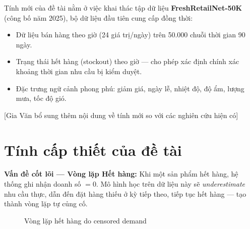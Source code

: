 \documentclass[12pt,a4paper]{report}
\begin{document}
Tính mới của đề tài nằm ở việc khai thác tập dữ liệu \textbf{FreshRetailNet-50K} (công bố năm 2025), bộ dữ liệu đầu tiên cung cấp đồng thời:
\begin{itemize}
    \item Dữ liệu bán hàng theo giờ (24 giá trị/ngày) trên 50.000 chuỗi thời gian 90 ngày.
    \item Trạng thái hết hàng (stockout) theo giờ --- cho phép xác định chính xác khoảng thời gian nhu cầu bị kiểm duyệt.
    \item Đặc trưng ngữ cảnh phong phú: giảm giá, ngày lễ, nhiệt độ, độ ẩm, lượng mưa, tốc độ gió.
\end{itemize}

[Gia Văn bổ sung thêm nội dung về tính mới so với các nghiên cứu hiện có]

\section{Tính cấp thiết của đề tài}

\textbf{Vấn đề cốt lõi — Vòng lặp Hết hàng:} Khi một sản phẩm hết hàng, hệ thống ghi nhận doanh số $= 0$. Mô hình học trên dữ liệu này sẽ \textit{underestimate} nhu cầu thực, dẫn đến đặt hàng thiếu ở kỳ tiếp theo, tiếp tục hết hàng --- tạo thành vòng lặp tự củng cố.

\begin{figure}[H]
\centering
{}
\caption{Vòng lặp hết hàng do censored demand}
\end{figure}
\end{document}
